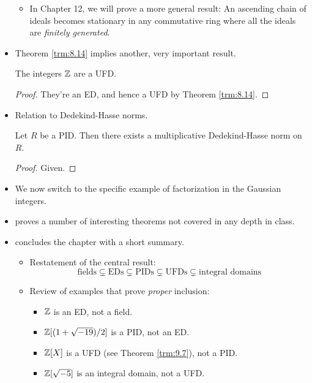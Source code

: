 \documentclass[../notes.tex]{subfiles}
\begin{document}
\begin{itemize}
    \begin{itemize}
        \item In Chapter 12, we will prove a more general result: An ascending chain of ideals becomes stationary in any commutative ring where all the ideals are \emph{finitely generated}.
    \end{itemize}
    \item Theorem \ref{trm:8.14} implies another, very important result.
    \begin{corollary}\label{cly:8.15}
        The integers $\mathbb{Z}$ are a UFD.
        \begin{proof}
            They're an ED, and hence a UFD by Theorem \ref{trm:8.14}.
        \end{proof}
    \end{corollary}
    \item Relation to Dedekind-Hasse norms.
    \begin{corollary}\label{cly:8.16}
        Let $R$ be a PID. Then there exists a multiplicative Dedekind-Hasse norm on $R$.
        \begin{proof}
            Given.
        \end{proof}
    \end{corollary}
    \item We now switch to the specific example of factorization in the Gaussian integers.
    \item \textcite{bib:DummitFoote} proves a number of interesting theorems not covered in any depth in class.
    \item \textcite{bib:DummitFoote} concludes the chapter with a short summary.
    \begin{itemize}
        \item Restatement of the central result:
        \begin{equation*}
            \text{fields} \subsetneq \text{EDs}
            \subsetneq \text{PIDs}
            \subsetneq \text{UFDs}
            \subsetneq \text{integral domains}
        \end{equation*}
        \item Review of examples that prove \emph{proper} inclusion:
        \begin{itemize}
            \item $\mathbb{Z}$ is an ED, not a field.
            \item $\mathbb{Z}[(1+\sqrt{-19})/2]$ is a PID, not an ED.
            \item $\mathbb{Z}[X]$ is a UFD (see Theorem \ref{trm:9.7}), not a PID.
            \item $\mathbb{Z}[\sqrt{-5}]$ is an integral domain, not a UFD.
        \end{itemize}
    \end{itemize}
\end{itemize}
\setcounter{proposition}{0}
\end{document}
